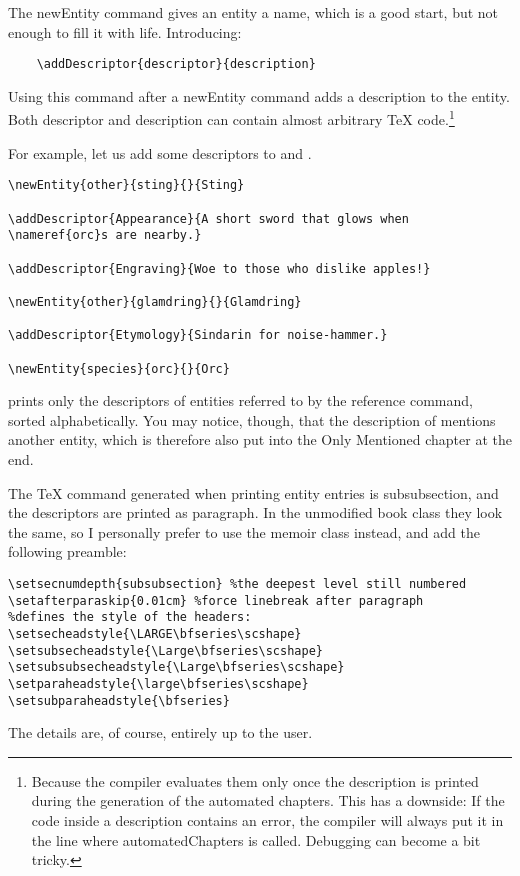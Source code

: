 \documentclass[openany]{book}
\begin{document}
The newEntity command gives an entity a name, which is a good start, but not enough to fill it with life. Introducing:
\begin{verbatim}
	\addDescriptor{descriptor}{description}
\end{verbatim}
Using this command after a newEntity command adds a description to the entity. Both descriptor and description can contain almost arbitrary \TeX{} code.\footnote{Because the compiler evaluates them only once the description is printed during the generation of the automated chapters. This has a downside: If the code inside a description contains an error, the compiler will always put it in the line where automatedChapters is called. Debugging can become a bit tricky.}

For example, let us add some descriptors to  and .

\begin{verbatim}
\newEntity{other}{sting}{}{Sting}

\addDescriptor{Appearance}{A short sword that glows when \nameref{orc}s are nearby.}

\addDescriptor{Engraving}{Woe to those who dislike apples!}

\newEntity{other}{glamdring}{}{Glamdring}

\addDescriptor{Etymology}{Sindarin for noise-hammer.}

\newEntity{species}{orc}{}{Orc}
\end{verbatim}







\LoreTex{} prints only the descriptors of entities referred to by the reference command, sorted alphabetically. You may notice, though, that the description of  mentions another entity, which is therefore also put into the Only Mentioned chapter at the end.

The \TeX{} command generated when printing entity entries is subsubsection, and the descriptors are printed as paragraph. In the unmodified book class they look the same, so I personally prefer to use the memoir class instead, and add the following preamble:
\begin{verbatim}
\setsecnumdepth{subsubsection} %the deepest level still numbered
\setafterparaskip{0.01cm} %force linebreak after paragraph
%defines the style of the headers:
\setsecheadstyle{\LARGE\bfseries\scshape}
\setsubsecheadstyle{\Large\bfseries\scshape}
\setsubsubsecheadstyle{\Large\bfseries\scshape}
\setparaheadstyle{\large\bfseries\scshape}
\setsubparaheadstyle{\bfseries}
\end{verbatim}
The details are, of course, entirely up to the user.

\automatedChapters{}
\end{document}

